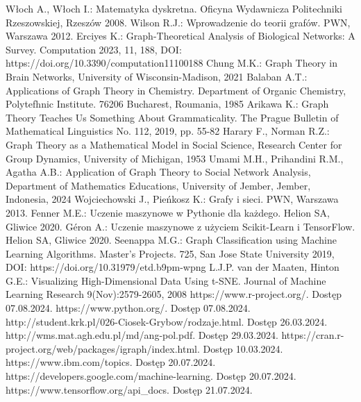 
\begin{thebibliography}{4}
     Włoch A., Włoch I.: Matematyka dyskretna. Oficyna Wydawnicza Politechniki Rzeszowskiej, Rzeszów 2008.
     Wilson R.J.: Wprowadzenie do teorii grafów. PWN, Warszawa 2012.
     Erciyes K.: Graph-Theoretical Analysis of Biological Networks: A Survey. Computation 2023, 11, 188, DOI: https://doi.org/10.3390/computation11100188
     Chung M.K.: Graph Theory in Brain Networks, University of Wisconsin-Madison, 2021 
     Balaban A.T.: Applications of Graph Theory in Chemistry. Department of Organic Chemistry, Polytefhnic Institute. 76206 Bucharest, Roumania, 1985
     Arikawa K.: Graph Theory Teaches Us Something About Grammaticality. The Prague Bulletin of Mathematical Linguistics No. 112, 2019, pp. 55-82
     Harary F., Norman R.Z.: Graph Theory as a Mathematical Model in Social Science, Research Center for Group Dynamics, University of Michigan, 1953
     Umami M.H., Prihandini R.M., Agatha A.B.: Application of Graph Theory to Social Network Analysis, Department of Mathematics Educations, University of Jember, Jember, Indonesia, 2024
     Wojciechowski J., Pieńkosz K.: Grafy i sieci. PWN, Warszawa 2013.
     Fenner M.E.: Uczenie maszynowe w Pythonie dla każdego. Helion SA, Gliwice 2020.
     Géron A.: Uczenie maszynowe z użyciem Scikit-Learn i TensorFlow. Helion SA, Gliwice 2020.
     Seenappa M.G.: Graph Classification using Machine Learning Algorithms. Master's Projects. 725, San Jose State University 2019, DOI: https://doi.org/10.31979/etd.b9pm-wpng
     L.J.P. van der Maaten, Hinton G.E.: Visualizing High-Dimensional Data Using t-SNE. Journal of Machine Learning Research 9(Nov):2579-2605, 2008
     https://www.r-project.org/. Dostęp 07.08.2024.
     https://www.python.org/. Dostęp 07.08.2024.
     http://student.krk.pl/026-Ciosek-Grybow/rodzaje.html. Dostęp 26.03.2024.
     http://wms.mat.agh.edu.pl/\texttildelow md/ang-pol.pdf. Dostęp 29.03.2024. 
     https://cran.r-project.org/web/packages/igraph/index.html. Dostęp 10.03.2024.
     https://www.ibm.com/topics. Dostęp 20.07.2024.
     https://developers.google.com/machine-learning. Dostęp 20.07.2024.
     https://www.tensorflow.org/api\_docs. Dostęp 21.07.2024.
\end{thebibliography}